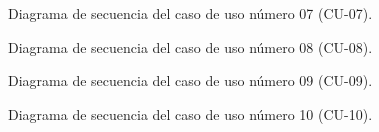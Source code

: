 \begin{figure}[htbp!]
	\begin{center}
		\caption{Diagrama de secuencia del caso de uso número 07 (CU-07).}
		\label{fig:Diagrama de secuencia CU-07}
	\end{center}
\end{figure}

\begin{figure}[htbp!]
	\begin{center}
		\caption{Diagrama de secuencia del caso de uso número 08 (CU-08).}
		\label{fig:Diagrama de secuencia CU-08}
	\end{center}
\end{figure}

\begin{figure}[htbp!]
	\begin{center}
		\caption{Diagrama de secuencia del caso de uso número 09 (CU-09).}
		\label{fig:Diagrama de secuencia CU-09}
	\end{center}
\end{figure}

\begin{figure}[htbp!]
	\begin{center}
		\caption{Diagrama de secuencia del caso de uso número 10 (CU-10).}
		\label{fig:Diagrama de secuencia CU-10}
	\end{center}
\end{figure}

